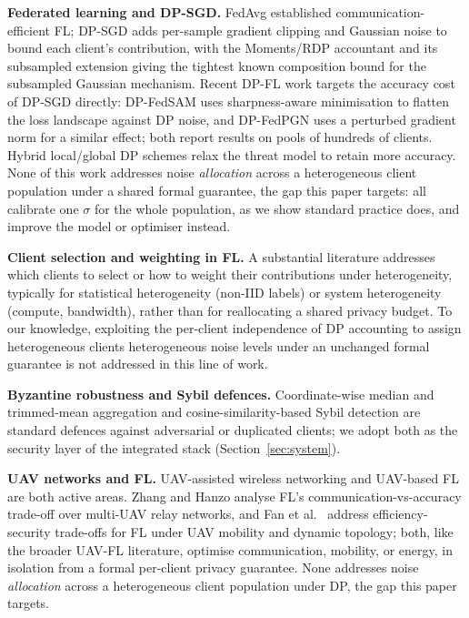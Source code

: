 \documentclass[journal]{IEEEtran}
\begin{document}
\textbf{Federated learning and DP-SGD.} FedAvg \cite{mcmahan2017}
established communication-efficient FL; DP-SGD \cite{abadi2016} adds
per-sample gradient clipping and Gaussian noise to bound each client's
contribution, with the Moments/RDP accountant \cite{mironov2017} and
its subsampled extension \cite{wang2019} giving the tightest known
composition bound for the subsampled Gaussian mechanism. Recent DP-FL
work targets the accuracy cost of DP-SGD directly: DP-FedSAM
\cite{shi2023} uses sharpness-aware minimisation to flatten the loss
landscape against DP noise, and DP-FedPGN \cite{liu2025} uses a
perturbed gradient norm for a similar effect; both report results on
pools of hundreds of clients. Hybrid local/global DP schemes
\cite{khalaf2024} relax the threat model to retain more accuracy. None
of this work addresses noise \emph{allocation} across a heterogeneous
client population under a shared formal guarantee, the gap this paper
targets: all calibrate one $\sigma$ for the whole population, as we
show standard practice does, and improve the model or optimiser instead.

\textbf{Client selection and weighting in FL.} A substantial literature
addresses which clients to select or how to weight their contributions
under heterogeneity, typically for statistical heterogeneity (non-IID
labels) or system heterogeneity (compute, bandwidth), rather than for
reallocating a shared privacy budget. To our knowledge, exploiting the
per-client independence of DP accounting to assign heterogeneous
clients heterogeneous noise levels under an unchanged formal guarantee
is not addressed in this line of work.

\textbf{Byzantine robustness and Sybil defences.} Coordinate-wise median
and trimmed-mean aggregation \cite{yin2018,blanchard2017} and
cosine-similarity-based Sybil detection \cite{fung2018} are standard
defences against adversarial or duplicated clients; we adopt both as
the security layer of the integrated stack (Section~\ref{sec:system}).

\textbf{UAV networks and FL.} UAV-assisted wireless networking
\cite{alhourani2014} and UAV-based FL are both active areas. Zhang and
Hanzo \cite{zhang2020tvt} analyse FL's communication-vs-accuracy
trade-off over multi-UAV relay networks, and Fan et al.\
\cite{fan2024} address efficiency-security trade-offs for FL under
UAV mobility and dynamic topology; both, like the broader UAV-FL
literature, optimise communication, mobility, or energy, in isolation
from a formal per-client privacy guarantee. None addresses noise
\emph{allocation} across a heterogeneous client population under DP,
the gap this paper targets.
\end{document}
